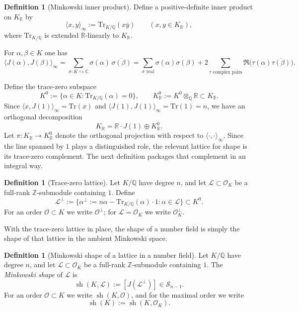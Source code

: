 \documentclass[11pt,letterpaper]{amsart}
\newcommand{\Q}{\mathbb{Q}}
\newcommand{\Z}{\mathbb{Z}}
\newcommand{\R}{\mathbb{R}}
\newcommand{\C}{\mathbb{C}}
\newcommand{\cO}{\mathcal{O}}
\newcommand{\Tr}{\mathrm{Tr}}
\theoremstyle{plain}
\theoremstyle{definition}
\newtheorem{definition}[theorem]{Definition}
\begin{document}
\begin{definition}[Minkowski inner product]\label{def:trace-inner}
Define a positive-definite inner product on $K_\R$ by
\begin{equation}\label{eq:trace-inner-product}
\langle x,y\rangle_\infty:=\Tr_{K/\Q}(x\overline y)\qquad (x,y\in K_\R),
\end{equation}
where $\Tr_{K/\Q}$ is extended $\R$-linearly to $K_\R$.
\end{definition}

For $\alpha,\beta\in K$ one has
\[
\langle J(\alpha),J(\beta)\rangle_\infty
=\sum_{\sigma:K\hookrightarrow \C}\sigma(\alpha)\,\overline{\sigma(\beta)}
=\sum_{\sigma\text{ real}}\sigma(\alpha)\sigma(\beta)
  +2\sum_{\tau\text{ complex pairs}}\Re\bigl(\tau(\alpha)\overline{\tau(\beta)}\bigr).
\]

Define the trace-zero subspace
\[
K^0:=\{\alpha\in K:\Tr_{K/\Q}(\alpha)=0\},\qquad K_\R^0:=K^0\otimes_\Q \R\subset K_\R.
\]
Since $\langle x,J(1)\rangle_\infty=\Tr(x)$ and $\langle J(1),J(1)\rangle_\infty=\Tr(1)=n$,
we have an orthogonal decomposition
\[
K_\R=\R\cdot J(1)\oplus K_\R^0.
\]
Let $\pi:K_\R\to K_\R^0$ denote the orthogonal projection with respect to $\langle\cdot,\cdot\rangle_\infty$. Since the line spanned by \(1\) plays a distinguished role, the relevant lattice for shape is its trace-zero complement. The next definition packages that complement in an integral way.


\begin{definition}[Trace-zero lattice]\label{def:perp}
Let $K/\Q$ have degree $n$, and let $\mathcal L\subset \cO_K$ be a full-rank $\Z$-submodule containing $1$.
Define
\begin{equation}\label{eq:perp-def}
\mathcal L^\perp:=\{\alpha^\perp:=n\alpha-\Tr_{K/\Q}(\alpha)\cdot 1:\alpha\in \mathcal L\}\subset K^0.
\end{equation}
For an order $\cO\subset K$ we write $\cO^\perp$; for $\mathcal L=\cO_K$ we write $\cO_K^\perp$.
\end{definition}

With the trace-zero lattice in place, the shape of a number field is simply the shape of that lattice in the ambient Minkowski space.

\begin{definition}[Minkowski shape of a lattice in a number field]\label{def:minkowski-shape}
Let $K/\Q$ have degree $n$, and let $\mathcal L\subset \cO_K$ be a full-rank $\Z$-submodule containing $1$.
The \emph{Minkowski shape} of $\mathcal L$ is
\[
\operatorname{sh}(K,\mathcal L):=[J(\mathcal L^\perp)]\in \mathscr S_{n-1}.
\]
For an order $\cO\subset K$ we write $\operatorname{sh}(K,\cO)$, and for the maximal order we write
\[
\operatorname{sh}(K):=\operatorname{sh}(K,\cO_K).
\]
\end{definition}
\end{document}

